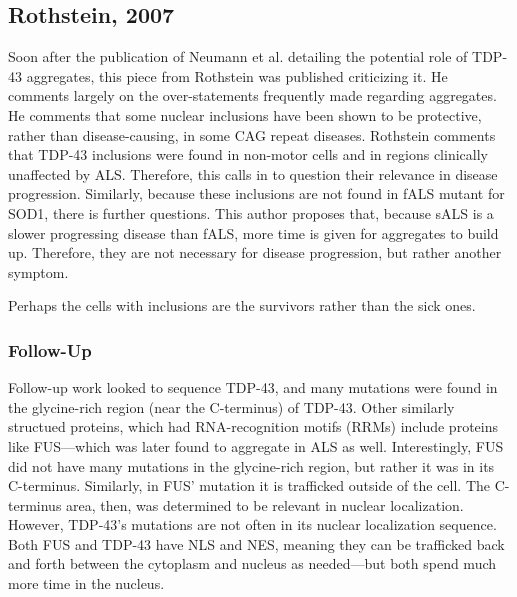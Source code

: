 \subsection*{Rothstein, 2007}

Soon after the publication of Neumann et al. detailing the potential role of TDP-43 aggregates, this piece from Rothstein was published criticizing it. He comments largely on the over-statements frequently made regarding aggregates. He comments that some nuclear inclusions have been shown to be protective, rather than disease-causing, in some CAG repeat diseases. Rothstein comments that TDP-43 inclusions were found in non-motor cells and in regions clinically unaffected by ALS. Therefore, this calls in to question their relevance in disease progression. Similarly, because these inclusions are not found in fALS mutant for SOD1, there is further questions. This author proposes that, because sALS is a slower progressing disease than fALS, more time is given for aggregates to build up. Therefore, they are not necessary for disease progression, but rather another symptom.\newline

Perhaps the cells with inclusions are the survivors rather than the sick ones. 

\subsubsection*{Follow-Up}

Follow-up work looked to sequence TDP-43, and many mutations were found in the glycine-rich region (near the C-terminus) of TDP-43. Other similarly structued proteins, which had RNA-recognition motifs (RRMs) include proteins like FUS---which was later found to aggregate in ALS as well. Interestingly, FUS did not have many mutations in the glycine-rich region, but rather it was in its C-terminus. Similarly, in FUS' mutation it is trafficked outside of the cell. The C-terminus area, then, was determined to be relevant in nuclear localization. However, TDP-43's mutations are not often in its nuclear localization sequence. Both FUS and TDP-43 have NLS and NES, meaning they can be trafficked back and forth between the cytoplasm and nucleus as needed---but both spend much more time in the nucleus.\newline

